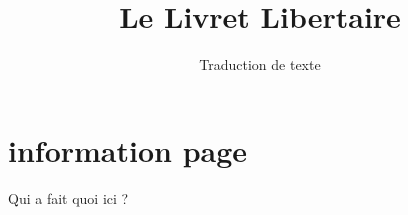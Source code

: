 \usepackage[utf8]{inputenc}
\usepackage{geometry}
\usepackage{shorttoc}

\usepackage{titlesec}
\titleformat{\part}[display]
  {\normalfont\huge\bfseries}{\centering\partname\ \thepart}{20pt}{\Huge\centering}
\titlespacing*{\part}{0pt}{50pt}{40pt}


\usepackage[french]{minitoc}
\setcounter{parttocdepth}{1}
\doparttoc[e]
\renewcommand\beforeparttoc{}



\usepackage[french]{babel}
\usepackage[pdfpagelayout=TwoPageRight,colorlinks,hidelinks]{hyperref}

\newcommand{\text}[3][\DefaultOpt]{%
	\def\DefaultOpt{#2}%
	\part[#1]{#2\\~\\\normalsize\normalfont texte original de #3}%
	\mtcaddpart
	\parttoc
	\cleardoublepage
}

\renewcommand{\chaptermark}[1]{\markboth{\parbox{0.95\textwidth}{\raggedleft\thechapter.\ #1}}{\parbox{0.95\textwidth}{\thechapter.\ #1}}}
\renewcommand{\sectionmark}[1]{\markright{\parbox{0.95\textwidth}{\thesection.\ #1}}{}}
\addto\captionsfrench{\renewcommand{\partname}{Texte}}



\title{Le Livret Libertaire}
\author{Traduction de texte}

 

\frontmatter
\maketitle

\chapter*{information page}
Qui a fait quoi ici ?
